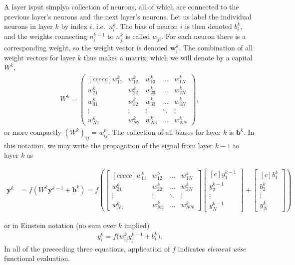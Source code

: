 \documentclass[a4paper, twocolumn]{article}
\newcommand{\pmat}[2]{\begin{pmatrix}[#1] #2 \end{pmatrix}}  %
\newcommand{\bmat}[2]{\begin{bmatrix}[#1] #2 \end{bmatrix}}  %
\begin{document}
A layer is\textemdash put simply\textemdash a collection of neurons, all of which are connected to the previous layer's neurons and the next layer's neurons. Let us label the individual neurons in layer $k$ by index $i$, i.e.\ $n_i^k$. The bias of neuron $i$ is then denoted $b^k_i$, and the weights connecting $n_i^{k-1}$ to $n_j^k$ is called $w_{ji}$. For each neuron there is a corresponding weight, so the weight vector is denoted $\bm{w}_i^k$. The combination of all weight vectors for layer $k$ thus makes a matrix, which we will denote by a capital $W^k$,
\begin{align}
W^k=\pmat{ccccc}{
  w^k_{11} & w^k_{12} & w^k_{13} & \dots & w^k_{1N} \\
  w^k_{21} & w^k_{22} & w^k_{23} & \dots & w^k_{2N} \\
  w^k_{31} & w^k_{32} & w^k_{33} & \dots & w^k_{3N} \\
  \vdots  &  \vdots   &   \vdots   & \ddots & \vdots \\
  w^k_{N1} & w^k_{N2} & w^k_{N3} & \dots & w^k_{NN}
}, \nonumber
\end{align}
or more compactly $(W^k)_{ij}=w^k_{ij}$. The collection of all biases for layer $k$ is $\mathbf{b}^k$. In this notation, we may write the propagation of the signal from layer $k-1$ to layer $k$ as 
\begin{strip}
\begin{align}
\mathbf{y}^k &= f(W^k\mathbf{y}^{k-1}+\mathbf{b}^k) 
=f\left( \bmat{ccccc}{
  w^k_{11} & w^k_{12}  & \dots & w^k_{1N} \\
  w^k_{21} & w^k_{22}  & \dots & w^k_{2N} \\
  \vdots  &  \vdots      & \ddots & \vdots \\
  w^k_{N1} & w^k_{N2}  & \dots & w^k_{NN}
} 
 \bmat{c}{y^{k-1}_1\\ y^{k-1}_2  \\ \vdots \\ y^{k-1}_N}  
+\bmat{c}{b^{k}_1  \\ b^{k}_2    \\ \vdots \\ y^{k}_N} \right) \label{eq:nnmatrix}
\end{align}
\end{strip}
or in Einstein notation (no sum over $k$ implied)
\begin{align}
y^k_i= f\big(w^k_{ij}y^{k-1}_j+b^k_i  \big).
\end{align}
In all of the preceeding three equations, application of $f$ indicates \emph{element wise} functional evaluation.
\end{document}
